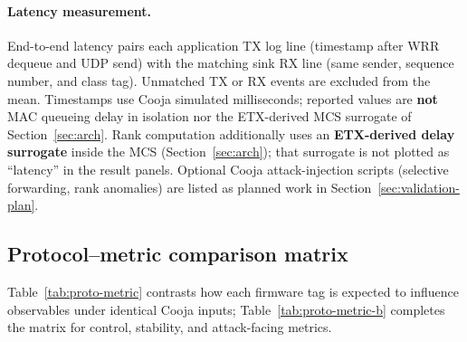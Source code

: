 \paragraph{Latency measurement.}
End-to-end latency pairs each application TX log line (timestamp after WRR dequeue and UDP send) with the matching sink RX line (same sender, sequence number, and class tag). Unmatched TX or RX events are excluded from the mean. Timestamps use Cooja simulated milliseconds; reported values are \textbf{not} MAC queueing delay in isolation nor the ETX-derived MCS surrogate of Section~\ref{sec:arch}.
Rank computation additionally uses an \textbf{ETX-derived delay surrogate} inside the MCS (Section~\ref{sec:arch}); that surrogate is not plotted as ``latency'' in the result panels. Optional Cooja attack-injection scripts (selective forwarding, rank anomalies) are listed as planned work in Section~\ref{sec:validation-plan}.

\subsection{Protocol--metric comparison matrix}
\label{sec:metric-matrix}
Table~\ref{tab:proto-metric} contrasts how each firmware tag is expected to influence observables under identical Cooja inputs; Table~\ref{tab:proto-metric-b} completes the matrix for control, stability, and attack-facing metrics.

\begin{aertablewide}[t]
  \begingroup\sloppy
  \caption{Protocol variants vs.\ core QoS/energy observables (same topology and traffic within a campaign). Expected trends vs.\ \texttt{RPL\_STANDARD} are stated \emph{in words} in each cell under mixed $C0$--$C3$ traffic unless noted.}
  \label{tab:proto-metric}
  \setlength{\tabcolsep}{2pt}%
  \endgroup
\end{aertablewide}

